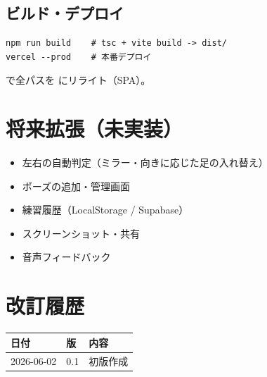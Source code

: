 \documentclass[a4paper,11pt]{ltjsarticle}
\begin{document}
\subsection{ビルド・デプロイ}

\begin{lstlisting}
npm run build    # tsc + vite build -> dist/
vercel --prod    # 本番デプロイ
\end{lstlisting}

 で全パスを  にリライト（SPA）。

\section{将来拡張（未実装）}

\begin{itemize}
  \item 左右の自動判定（ミラー・向きに応じた足の入れ替え）
  \item ポーズの追加・管理画面
  \item 練習履歴（LocalStorage / Supabase）
  \item スクリーンショット・共有
  \item 音声フィードバック
\end{itemize}

\section{改訂履歴}

\begin{table}[h]
  \centering
  \begin{tabular}{@{}lll@{}}
    \toprule
    日付 & 版 & 内容 \\
    \midrule
    2026-06-02 & 0.1 & 初版作成 \\
    \bottomrule
  \end{tabular}
\end{table}
\end{document}
